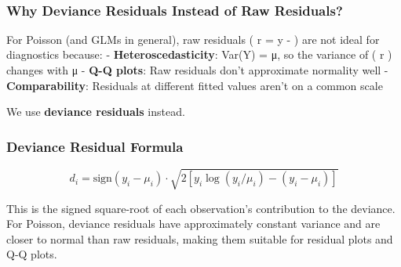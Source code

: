 \documentclass[11pt]{article}
\begin{document}
    \begin{center}
    \end{center}
    { \hspace*{\fill} \\}
    
    \hypertarget{why-deviance-residuals-instead-of-raw-residuals}{%
\subsubsection{Why Deviance Residuals Instead of Raw
Residuals?}\label{why-deviance-residuals-instead-of-raw-residuals}}

For Poisson (and GLMs in general), raw residuals ( r = y - \mu ) are not
ideal for diagnostics because: - \textbf{Heteroscedasticity}: Var(Y) =
μ, so the variance of ( r ) changes with μ - \textbf{Q-Q plots}: Raw
residuals don't approximate normality well - \textbf{Comparability}:
Residuals at different fitted values aren't on a common scale

We use \textbf{deviance residuals} instead.

    \hypertarget{deviance-residual-formula}{%
\subsubsection{Deviance Residual
Formula}\label{deviance-residual-formula}}

\[d_i = \text{sign}(y_i - \mu_i) \cdot \sqrt{2 \left[ y_i \log(y_i/\mu_i) - (y_i - \mu_i) \right]}\]

This is the signed square-root of each observation's contribution to the
deviance. For Poisson, deviance residuals have approximately constant
variance and are closer to normal than raw residuals, making them
suitable for residual plots and Q-Q plots.
\end{document}
